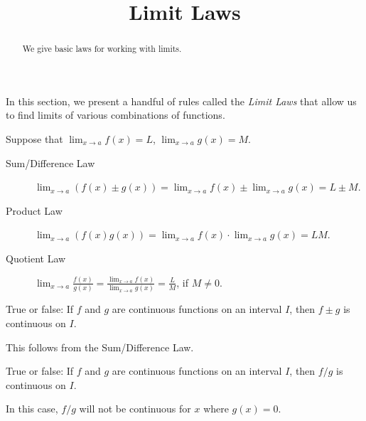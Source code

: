 \documentclass{ximera}
\title[Dig-In:]{Limit Laws}
\begin{document}
\begin{abstract}
We give basic laws for working with limits. 
\end{abstract}
\maketitle


In this section, we present a handful of rules called the \textit{Limit Laws}
that allow us to find limits of various combinations of functions.

\begin{theorem}\label{theorem:limit-laws}
Suppose that $\lim_{x\to a}f(x)=L$, $\lim_{x\to a}g(x)=M$.
\begin{description}
\item[Sum/Difference Law] $\lim_{x\to a} (f(x) \pm g(x)) =
  \lim_{x\to a}f(x) \pm \lim_{x\to a}g(x)=L \pm M$.
\item[Product Law]  $\lim_{x\to a} (f(x)g(x)) = \lim_{x\to
  a}f(x)\cdot\lim_{x\to a}g(x)=LM$.
\item[Quotient Law]  $\lim_{x\to a} \frac{f(x)}{g(x)} =
  \frac{\lim_{x\to a}f(x)}{\lim_{x\to a}g(x)}=\frac{L}{M}$, if
  $M\ne0$.
\end{description}
\label{thm:limit laws}
\end{theorem}

\begin{question}
  True or false: If $f$ and $g$ are continuous functions on an
  interval $I$, then $f\pm g$ is continuous on $I$.
  \begin{multipleChoice}
  \end{multipleChoice}
  \begin{feedback}
    This follows from the Sum/Difference Law.
  \end{feedback}
\end{question}

\begin{question}
  True or false: If $f$ and $g$ are continuous functions on an
  interval $I$, then $f/g$ is continuous on $I$.
  \begin{multipleChoice}
  \end{multipleChoice}
  \begin{feedback}
    In this case, $f/g$ will not be continuous for $x$ where $g(x) =
    0$.
  \end{feedback}
\end{question}
\end{document}
